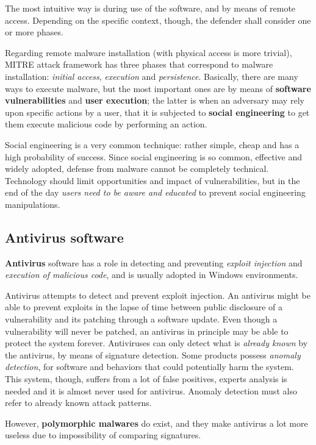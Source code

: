 \documentclass[10pt]{extreport}
\begin{document}
The most intuitive way is during use of the software, and by means of remote
access. Depending on the specific context, though, the defender shall consider
one or more phases.

Regarding remote malware installation (with physical access is more trivial),
MITRE attack framework has three phases that correspond to malware
installation: \emph{initial access}, \emph{execution} and \emph{persistence}.
Basically, there are many ways to execute malware, but the most important ones
are by means of \textbf{software vulnerabilities} and \textbf{user execution};
the latter is when an adversary may rely upon specific actions by a user, that
it is subjected to \textbf{social engineering} to get them execute malicious
code by performing an action.

Social engineering is a very common technique: rather simple, cheap and has a
high probability of success. Since social engineering is so common, effective
and widely adopted, defense from malware cannot be completely technical.
Technology should limit opportunities and impact of vulnerabilities, but in the
end of the day \emph{users need to be aware and educated} to prevent social
engineering manipulations.

\subsection{Antivirus software}

\textbf{Antivirus} software has a role in detecting and preventing
\emph{exploit injection} and \emph{execution of malicious code}, and is usually
adopted in Windows environments.

Antivirus attempts to detect and prevent exploit injection. An antivirus might
be able to prevent exploits in the lapse of time between public disclosure of a
vulnerability and its patching through a software update. Even though a
vulnerability will never be patched, an antivirus in principle may be able to
protect the system forever. Antiviruses can only detect what is \emph{already
known} by the antivirus, by means of signature detection. Some products possess
\emph{anomaly detection}, for software and behaviors that could potentially
harm the system. This system, though, suffers from a lot of false positives,
experts analysis is needed and it is almost never used for antivirus. Anomaly
detection must also refer to already known attack patterns.

However, \textbf{polymorphic malwares} do exist, and they make antivirus
a lot more useless due to impossibility of comparing signatures.
\end{document}

